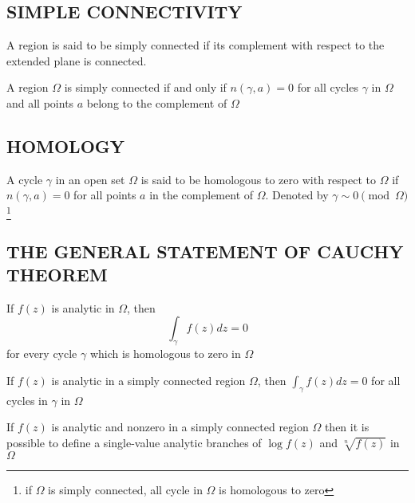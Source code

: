\documentclass{report}
\begin{document}
\subsection{SIMPLE CONNECTIVITY}

\begin{definition}
    A region is said to be simply connected if its complement with respect to the extended plane is connected.
\end{definition}

\begin{theorem}
    A region $\Omega$ is simply connected if and only if $n(\gamma, a) = 0$ for all cycles $\gamma$ in $\Omega$ and all points $a$ belong to the complement of $\Omega$
\end{theorem}

\subsection{HOMOLOGY}

\begin{definition}[Homologous]
    A cycle $\gamma$ in an open set $\Omega$ is said to be homologous to zero with respect to $\Omega$ if $n(\gamma, a) = 0$ for all points $a$ in the complement of $\Omega$. Denoted by $\gamma \sim 0 \pmod{\Omega}$ \footnote{if $\Omega$ is simply connected, all cycle in $\Omega$ is homologous to zero}
\end{definition}

\subsection{THE GENERAL STATEMENT OF CAUCHY THEOREM}

\begin{theorem}
    If $f(z)$ is analytic in $\Omega$, then
    \[
        \int_\gamma f(z) dz = 0
    \]
    for every cycle $\gamma$ which is homologous to zero in $\Omega$
\end{theorem}

\begin{corollary}
    If $f(z)$ is analytic in a simply connected region $\Omega$, then $\int_\gamma f(z) dz = 0$ for all cycles in $\gamma$ in $\Omega$
\end{corollary}

\begin{corollary}
    If $f(z)$ is analytic and nonzero in a simply connected region $\Omega$ then it is possible to define a single-value analytic branches of $\log f(z)$ and $\sqrt[n]{f(z)}$ in $\Omega$
\end{corollary}
\end{document}
